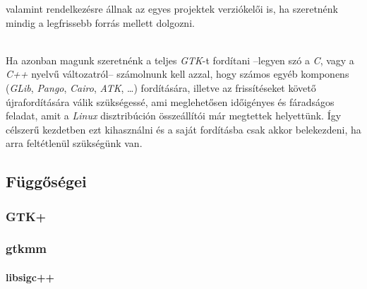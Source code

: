valamint rendelkezésre állnak az egyes projektek verziókelői is, ha szeretnénk mindig a legfrissebb forrás mellett dolgozni.

\\

Ha azonban magunk szeretnénk a teljes \textit{GTK}-t fordítani --legyen szó a \textit{C}, vagy a \textit{C++} nyelvű változatról-- számolnunk kell azzal, hogy számos egyéb komponens (\textit{GLib}, \textit{Pango}, \textit{Cairo}, \textit{ATK}, \dots) fordítására, illetve az frissítéseket követő újrafordítására válik szükségessé, ami meglehetősen időigényes és fáradságos feladat, amit a \textit{Linux} disztribúción összeállítói már megtettek helyettünk. Így célszerű kezdetben ezt kihasználni és a saját fordításba csak akkor belekezdeni, ha arra feltétlenül szükségünk van.

\subsection{Függőségei}

\subsubsection{GTK+}


%
%
%
%
%
%
%
%
%

\subsubsection{gtkmm}

\paragraph{libsigc++}

